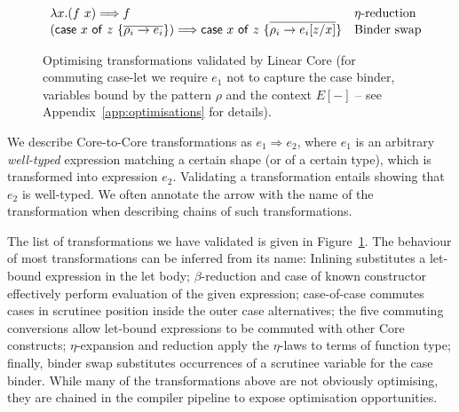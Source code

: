 \documentclass[acmsmall,review,screen]{acmart}
\newcommand{\ccase}[2]{\mathsf{case}~#1~\mathsf{of}~#2}
\begin{document}
\begin{figure}[t]
{\[\begin{array}{ll}
      \lambda x.(f~x) \Longrightarrow f & \mbox{$\eta$-reduction}\\
      (\ccase{x}{z~\{\ov{\rho_i\to e_i}\}}) \Longrightarrow \ccase{x}{z~\{\ov{\rho_i\to  e_i[z/x]}\}}
                                                                      & \mbox{Binder swap}\\
    \end{array}
  \]}
  \caption{Optimising transformations validated by Linear
    Core\label{fig:opttrans} (for commuting case-let we
      require $e_1$ not to capture the case binder, variables bound by the
      pattern $\rho$ and the context $E[{-}]$ -- see Appendix~\ref{app:optimisations} for
    details).} 
\end{figure}





We describe Core-to-Core transformations as $e_1 \Longrightarrow e_2$,
where $e_1$ is an arbitrary \emph{well-typed} expression
matching a certain shape (or of a certain type), which is
transformed into expression $e_2$. Validating a transformation
entails showing that $e_2$ is well-typed. We often annotate the arrow
with the name of the transformation when describing chains of such
transformations.

The list of transformations we have
validated is given in Figure~\ref{fig:opttrans}.
%
The behaviour of most transformations can be inferred from its name:
Inlining substitutes a let-bound expression in the let body; $\beta$-reduction
and case of known constructor effectively perform evaluation of the given expression;
case-of-case commutes cases in scrutinee position inside the outer case alternatives;
the five commuting conversions allow let-bound expressions to be commuted with other
Core constructs; $\eta$-expansion and reduction apply the $\eta$-laws to terms of function type;
finally, binder swap substitutes occurrences of a scrutinee variable for the
case binder. While many of the transformations above are not obviously optimising,
they are chained in the compiler pipeline to expose optimisation opportunities.


\end{document}
